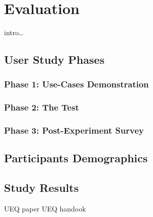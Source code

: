\chapter{Evaluation}\label{chapter:eval}
intro\ldots
\section{User Study Phases}
\subsection{Phase 1: Use-Cases Demonstration}
\subsection{Phase 2: The Test}
\subsection{Phase 3: Post-Experiment Survey}
\section{Participants Demographics}
\section{Study Results}
UEQ paper \cite{laugwitz2008construction}
UEQ handook \cite{UEQHandbook}
